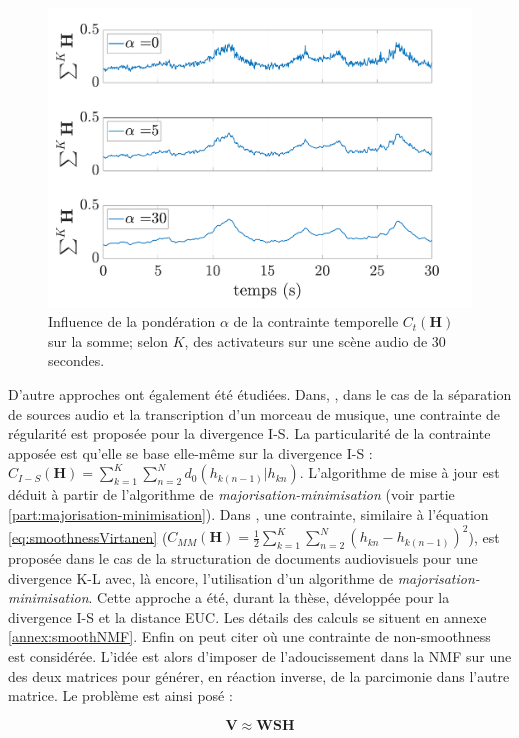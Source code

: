 \begin{figure}[hbtp]
\centering
	\includegraphics[width=0.7\linewidth]{./figures/NMF/smoothness_02.pdf}
\caption{Influence de la pondération $\alpha$ de la contrainte temporelle $C_t(\mathbf{H})$ sur la somme; selon $K$, des activateurs sur une scène audio de 30 secondes.}
\label{fig:smoothnessExample}
\end{figure}

D'autre approches ont également été étudiées. Dans, \cite{fevotte2011majorization}, dans le cas de la séparation de sources audio et la transcription d'un morceau de musique, une contrainte de régularité est proposée pour la divergence I-S. La particularité de la contrainte apposée est qu'elle se base elle-même sur la divergence I-S : $C_{I-S}(\mathbf{H}) = \sum_{k = 1}^{K} \sum_{n = 2}^{N}d_0(h_{k(n-1)} \vert h_{kn})$. L'algorithme de mise à jour est déduit à partir de l'algorithme de \textit{majorisation-minimisation} (voir partie \ref{part:majorisation-minimisation}). Dans \cite{essid2013smooth}, une contrainte, similaire à l'équation \ref{eq:smoothnessVirtanen} ($C_{MM}(\mathbf{H}) = \frac{1}{2}\sum_{k = 1}^{K} \sum_{n = 2}^{N}\left(h_{kn}-h_{k(n-1)}\right)^2$), est proposée dans le cas de la structuration de documents audiovisuels pour une divergence K-L avec, là encore, l'utilisation d'un algorithme de \textit{majorisation-minimisation}. Cette approche a été, durant la thèse, développée pour la divergence I-S et la distance EUC. Les détails des calculs se situent en annexe \ref{annex:smoothNMF}.
Enfin on peut citer \cite{pascual2006nonsmooth} où une contrainte de \og non-smoothness \fg{} est considérée. L'idée est alors d'imposer de l'adoucissement dans la NMF sur une des deux matrices pour générer, en réaction inverse, de la parcimonie dans l'autre matrice. Le problème est ainsi posé :

\begin{equation}
\mathbf{V} \approx \mathbf{WSH}
\end{equation}


